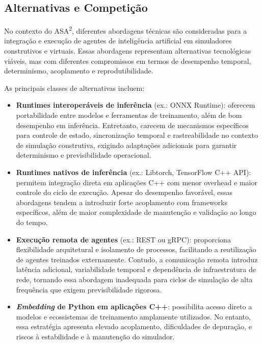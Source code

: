 \subsection{Alternativas e Competição}

No contexto do ASA\textsuperscript{2}, diferentes abordagens técnicas são consideradas para a integração e execução de agentes de inteligência artificial em simuladores construtivos e virtuais. Essas abordagens representam alternativas tecnológicas viáveis, mas com diferentes compromissos em termos de desempenho temporal, determinismo, acoplamento e reprodutibilidade.

As principais classes de alternativas incluem:

\begin{itemize}
    \item \textbf{Runtimes interoperáveis de inferência} (ex.: ONNX Runtime): oferecem portabilidade entre modelos e ferramentas de treinamento, além de bom desempenho em inferência. Entretanto, carecem de mecanismos específicos para controle de estado, sincronização temporal e rastreabilidade no contexto de simulação construtiva, exigindo adaptações adicionais para garantir determinismo e previsibilidade operacional.

    \item \textbf{Runtimes nativos de inferência} (ex.: Libtorch, TensorFlow C++ API): permitem integração direta em aplicações C++ com menor overhead e maior controle do ciclo de execução. Apesar do desempenho favorável, essas abordagens tendem a introduzir forte acoplamento com frameworks específicos, além de maior complexidade de manutenção e validação ao longo do tempo.

    \item \textbf{Execução remota de agentes} (ex.: REST ou gRPC): proporciona flexibilidade arquitetural e isolamento de processos, facilitando a reutilização de agentes treinados externamente. Contudo, a comunicação remota introduz latência adicional, variabilidade temporal e dependência de infraestrutura de rede, tornando essa abordagem inadequada para ciclos de simulação de alta frequência que exigem previsibilidade rigorosa.

    \item \textbf{\emph{Embedding} de Python em aplicações C++}: possibilita acesso direto a modelos e ecossistemas de treinamento amplamente utilizados. No entanto, essa estratégia apresenta elevado acoplamento, dificuldades de depuração, e riscos à estabilidade e à manutenção do simulador.
\end{itemize}

